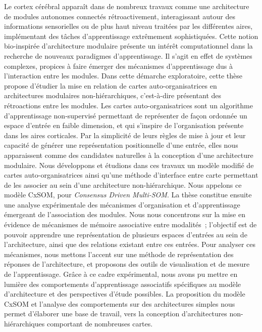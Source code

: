 \documentclass[11pt]{thesul-cs}
\begin{document}
\dominitoc

\begin{ThesisAbstract}
  \begin{FrenchAbstract}
  Le cortex cérébral apparaît dans de nombreux travaux comme une architecture de modules autonomes connectés rétroactivement, interagissant autour des informations sensorielles ou de plus haut niveau traitées par les différentes aires, implémentant des tâches d'apprentissage extrêmement sophistiquées. Cette notion bio-inspirée d'architecture modulaire présente un intérêt computationnel dans la recherche de nouveaux paradigmes d'apprentissage. Il s'agit en effet de systèmes complexes, propices à faire émerger des mécanismes d'apprentissage dus à l'interaction entre les modules.
  Dans cette démarche exploratoire, cette thèse propose d'étudier la mise en relation de cartes auto-organisatrices en architectures modulaires non-hiérarchiques, c'est-à-dire présentant des rétroactions entre les modules.
  Les cartes auto-organisatrices sont un algorithme d'apprentissage non-supervisé permettant de représenter de façon ordonnée un espace d'entrée en faible dimension, et qui s'inspire de l'organisation présente dans les aires corticales. 
  Par la simplicité de leurs règles de mise à jour et leur capacité de générer une représentation positionnelle d'une entrée, elles nous apparaissent comme des candidates naturelles à la conception d'une architecture modulaire.
  Nous développons et étudions dans ces travaux un modèle modifié de cartes auto-organisatrices ainsi qu'une méthode d'interface entre carte permettant de les associer au sein d'une architecture non-hiérarchique. Nous appelons ce modèle CxSOM, pour \emph{Consensus Driven Multi-SOM}.
  La thèse constitue ensuite une analyse expérimentale des mécanismes d'organisation et d'apprentissage émergeant de l'association des modules. Nous nous concentrons sur la mise en évidence de mécanismes de mémoire associative entre modalités~; l'objectif est de pouvoir apprendre une représentation de plusieurs espaces d'entrées au sein de l'architecture, ainsi que des relations existant entre ces entrées.
  Pour analyser ces mécanismes, nous mettons l'accent sur une méthode de représentation des réponses de l'architecture, et proposons des outils de visualisation et de mesure de l'apprentissage. Grâce à ce cadre expérimental, nous avons pu mettre en lumière des comportements d'apprentissage associatifs spécifiques au modèle d'architecture et des perspectives d'étude possibles.
  La proposition du modèle CxSOM et l'analyse des comportements sur des architectures simples nous permet d'élaborer une base de travail, vers la conception d'architectures non-hiérarchiques comportant de nombreuses cartes.


\end{FrenchAbstract}
\end{ThesisAbstract}
\end{document}

